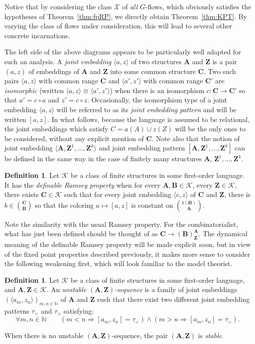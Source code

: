 \documentclass[11pt]{article}
\theoremstyle{definition}
\newtheorem{defi}[theo]{Definition}
\numberwithin{equation}{section}
\numberwithin{figure}{section}
\numberwithin{table}{section}
\newcommand{\N}{\mathbb{N}}
\newcommand{\K}{\mathcal{K}}
\newcommand*{\mA}{\mathbf{A}}
\newcommand*{\mB}{\mathbf{B}}
\newcommand*{\mC}{\mathbf{C}}
\newcommand*{\mZ}{\mathbf{Z}}
\let\oldforall\forall
\renewcommand*{\forall}{\mathrel{\oldforall}}
\begin{document}
Notice that by considering the class $\mathcal X$ of \emph{all} $G$-flows, which obviously satisfies the hypotheses of Theorem~\ref{thm:fpRP}, we directly obtain Theorem~\ref{thm:KPT}. By varying the class of flows under consideration, this will lead to several other concrete incarnations.

The left side of the above diagrams appears to be particularly well adapted for such an analysis. A \emph{joint embedding} $\langle a,z\rangle$ of two structures $\mA$ and $\mZ$ is a pair $(a,z)$ of embeddings of $\mA$ and $\mZ$ into some common structure $\mC$. Two such pairs $\langle a,z\rangle$ with common range $\mC$ and $\langle a',z'\rangle$ with common range $\mC'$ are \emph{isomorphic} (written $\langle a,z\rangle \cong \langle a',z'\rangle$) when there is an isomorphism $c:\mC\rightarrow \mC'$ so that $a'=c\circ a$ and $z'=c\circ z$. Occasionally, the isomorphism type of a joint embedding $\langle a,z\rangle$ will be referred to as its \emph{joint embedding pattern} and will be written $[a,z]$. In what follows, because the language is assumed to be relational, the joint embeddings which satisfy $C=a(A)\cup z(Z)$ will be the only ones to be considered, without any explicit mention of $\mC$. Note also that the notion of joint embedding $\langle \mA, \mZ^{1},\ldots,\mZ^{k}\rangle$ and joint embedding pattern $[\mA, \mZ^{1},\ldots,\mZ^{k}]$ can be defined in the same way in the case of finitely many structures $\mA$, $\mZ^{1},\ldots,\mZ^{k}$.

\begin{defi}
Let $\K$ be a class of finite structures in some first-order language. It has the \emph{definable Ramsey property} when for every $\mA, \mB\in \K$, every $\mZ\in \K$, there exists $\mC \in \K$ such that for every joint embedding $\langle c,z\rangle$ of $\mC$ and $\mZ$, there is $b\in \binom{\mC}{\mB}$ so that the coloring $a\mapsto [a,z]$ is constant on $\binom{b(\mB)}{\mA}$.
\end{defi}

Note the similarity with the usual Ramsey property. For the combinatorialist, what has just been defined should be thought of as $\mC \rightarrow (\mB)^{\mA}_{\mZ}$. The dynamical meaning of the definable Ramsey property will be made explicit soon, but in view of the fixed point properties described previously, it makes more sense to consider the following weakening first, which will look familiar to the model theorist.

\begin{defi}
Let $\K$ be a class of finite structures in some first-order language, and $\mA, \mZ\in \K$. An \emph{unstable $(\mA,\mZ)$-sequence} is a family of joint embeddings $(\langle a_{m}, z_{n}\rangle)_{m, n\in\N}$ of $\mA$ and $\mZ$ such that there exist two different joint embedding patterns $\tau_{<}$ and $\tau_{>}$ satisfying:
\[
\forall m,n\in \N \qquad (m<n \Rightarrow [a_{m},z_{n}] = \tau_{<})\wedge (m>n \Rightarrow [a_{m},z_{n}] = \tau_{>}).
\]

When there is no unstable $(\mA, \mZ)$-sequence, the pair $(\mA, \mZ)$ is \emph{stable}.
\end{defi}
\end{document}
